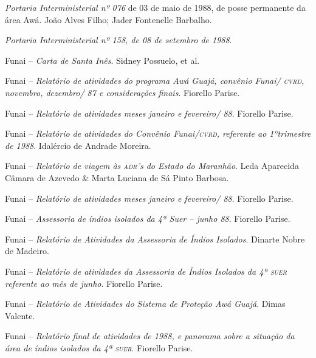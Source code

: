 \begin{itemize}
{\item[1988] \emph{Portaria Interministerial nº 076} de 03 de maio de
1988, de posse permanente da área Awá. João Alves Filho; Jader
Fontenelle Barbalho.

\item[1988] \emph{Portaria Interministerial nº 158, de 08 de setembro
de 1988}.

\item[1988] Funai -- \emph{Carta de Santa Inês}. Sidney Possuelo, et
al.

\item[1988] Funai -- \emph{Relatório de atividades do programa
Awá Guajá, convênio Funai/ \textsc{cvrd}, novembro, dezembro/ 87 e considerações
finais}. Fiorello Parise.

\item[1988] Funai -- \emph{Relatório de atividades meses janeiro e
fevereiro/ 88}. Fiorello Parise.

\item[1988] Funai -- \emph{Relatório de atividades do Convênio
Funai/\textsc{cvrd}, referente ao 1ºtrimestre de 1988}. Idalércio de Andrade
Moreira.

\item[1988] Funai -- \emph{Relatório de viagem às \textsc{adr}'s do Estado do
Maranhão}. Leda Aparecida Câmara de Azevedo \& Marta Luciana de Sá Pinto
Barbosa.

\item[1988] Funai -- \emph{Relatório de atividades meses janeiro e
fevereiro/ 88}. Fiorello Parise.

\item[1988] Funai -- \emph{Assessoria de índios isolados da 4ª Suer
-- junho 88}. Fiorello Parise.

\item[1988] Funai -- \emph{Relatório de Atividades da Assessoria de
Índios Isolados}. Dinarte Nobre de Madeiro.

\item[1988] Funai -- \emph{Relatório de atividades da Assessoria de
Índios Isolados da 4ª \textsc{suer} referente ao mês de junho}. Fiorello Parise.

\item[1988] Funai -- \emph{Relatório de Atividades do Sistema de
Proteção Awá Guajá}. Dimas Valente.

\item[1988] Funai -- \emph{Relatório final de atividades de 1988, e
panorama sobre a situação da área de índios isolados da 4ª \textsc{suer}}.
Fiorello Parise.

}
\end{itemize}
